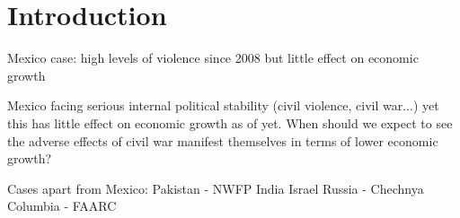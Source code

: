 \section{Introduction}
\label{intro}

Mexico case: high levels of violence since 2008 but little effect on economic growth

Mexico facing serious internal political stability (civil violence, civil war...) yet this has little effect on economic growth as of yet. When should we expect to see the adverse effects of civil war manifest themselves in terms of lower economic growth?

Cases apart from Mexico:
Pakistan - NWFP
India
Israel
Russia - Chechnya
Columbia - FAARC

